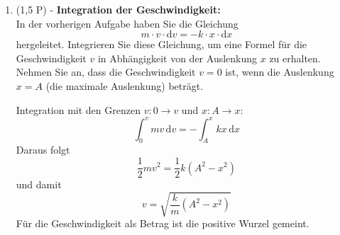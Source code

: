 \documentclass[11pt, a4paper]{article}
\begin{document}
\begin{enumerate}[label=\textbf{\arabic*.},itemsep=0.50cm]
    \item (1,5 P) - \textbf{Integration der Geschwindigkeit:} \\
    In der vorherigen Aufgabe haben Sie die Gleichung
    \begin{equation*}
        m \cdot v \cdot \mathrm{d}v = -k \cdot x \cdot \mathrm{d}x
    \end{equation*}
    hergeleitet. Integrieren Sie diese Gleichung, um eine Formel für die Geschwindigkeit $v$ in Abhängigkeit von der Auslenkung $x$ zu erhalten. Nehmen Sie an, dass die Geschwindigkeit $v = 0$ ist, wenn die Auslenkung $x = A$ (die maximale Auslenkung) beträgt.
    \begin{solutionbox}
        Integration mit den Grenzen $v: 0 \to v$ und $x: A \to x$:
        \[
        \int_0^v m v \, \mathrm{d}v = -\int_A^x k x \, \mathrm{d}x
        \]
        Daraus folgt
        \[
        \frac{1}{2} m v^2 = \frac{1}{2} k \left(A^2 - x^2\right)
        \]
        und damit
        \[
        v = \sqrt{\frac{k}{m}\left(A^2 - x^2\right)}
        \]
        Für die Geschwindigkeit als Betrag ist die positive Wurzel gemeint.
    \end{solutionbox}

\end{enumerate}

\vspace{1cm}
\end{document}
